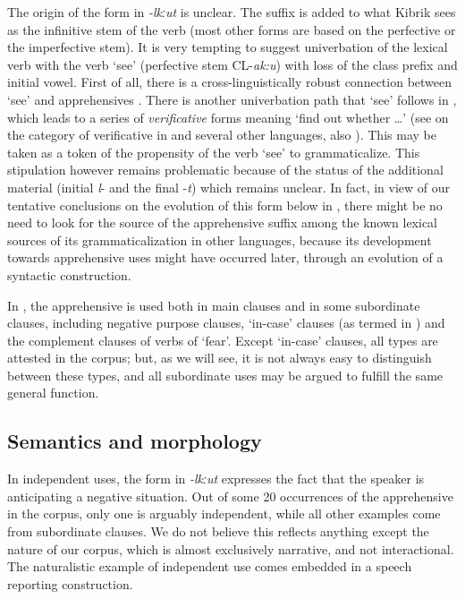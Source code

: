 \documentclass[output=paper,colorlinks,citecolor=brown]{langscibook}
\begin{document}
The origin of the form in \textit{-lkːut} is unclear. The suffix is added to what Kibrik sees as the infinitive stem of the verb (most other forms are based on the perfective or the imperfective stem). It is very tempting to suggest univerbation of the lexical verb with the verb `see' (perfective stem \textsc{CL}-\textit{ak:u}) with loss of the class prefix and initial vowel. First of all, there is a cross-linguistically robust connection between `see' and apprehensives \citep{ lichtenberk1995,Dobrushina2006cyrillic}. There is another univerbation path that `see' follows in , which leads to a series of \textit{verificative} forms meaning `find out whether  \ldots' (see \citealt{Maisak2016} on the category of verificative in  and several other  languages, also \citealt{Kibrik1977}). This may be taken as a token of the propensity of the verb `see' to grammaticalize. This stipulation however remains problematic because of the status of the additional material (initial \textit{l}- and the final \nobreakdash-\textit{t}) which remains unclear. In fact, in view of our tentative conclusions on the evolution of this form below in , there might be no need to look for the source of the apprehensive suffix among the known lexical sources of its grammaticalization in other languages, because its development towards apprehensive uses might have occurred later, through an evolution of a syntactic construction.   

In , the apprehensive is used both in main clauses and in some subordinate clauses, including negative purpose clauses, `in-case' clauses (as termed in \citealt{lichtenberk1995}) and the complement clauses of verbs of `fear'. Except `in-case' clauses, all types are attested in the corpus; but, as we will see, it is not always easy to distinguish between these types, and all subordinate uses may be argued to fulfill the same general function.



\subsection{Semantics and morphology}
\label{subsec:Asemmorph}

In independent uses, the  form in \textit{-lkːut} expresses the fact that the speaker is anticipating a negative situation. Out of some 20 occurrences of the apprehensive in the corpus, only one is arguably independent, while all other examples come from subordinate clauses. We do not believe this reflects anything except the nature of our corpus, which is almost exclusively narrative, and not interactional. The naturalistic example of independent use comes embedded in a speech reporting construction. 
\end{document}
